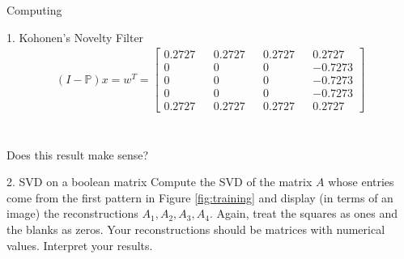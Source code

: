 \begin{section}{Computing}
\begin{homeworkSection}{1. Kohonen's Novelty Filter }
{    \begin{align*} (I-\mathbb{P})x = w^T =  \begin{bmatrix}
            0.2727  &&  0.2727  &&  0.2727  &&  0.2727 \\
                 0  &&       0  &&       0  && -0.7273 \\
                 0  &&       0  &&       0  && -0.7273 \\
                 0  &&       0  &&       0  && -0.7273 \\
            0.2727  &&  0.2727  &&  0.2727  &&  0.2727
    \end{bmatrix}\end{align*}
    \\
    \\ 
    Does this result make sense?
}

\end{homeworkSection}


\begin{homeworkSection}{2. SVD on a boolean matrix}
Compute the SVD of the matrix $A$ whose entries come from the first pattern in Figure \ref{fig:training} and display (in terms of an image) the reconstructions $A_1, A_2, A_3, A_4$. Again, treat the squares as ones and the blanks as zeros. Your reconstructions should be matrices with numerical values. Interpret your results.


\end{homeworkSection}
\end{section}
